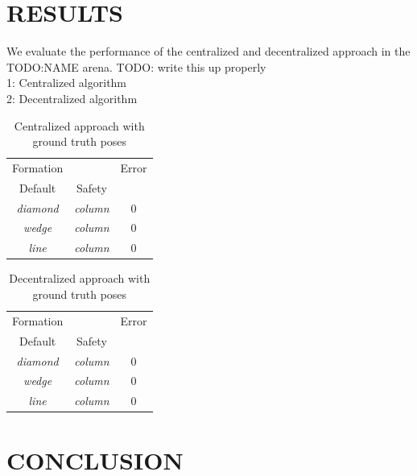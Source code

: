 \documentclass[letterpaper, 10 pt, conference]{ieeeconf}  %
\begin{document}
	\section{RESULTS}
	We evaluate the performance of the centralized and decentralized approach in the TODO:NAME arena. 
	TODO: write this up properly \\
	1: Centralized algorithm  \\
	2: Decentralized algorithm  \\
	
	\begin{table}[h]
		\begin{center}
			\begin{tabular}{|c c|c|}
				\hline
				Formation &         & Error \\
				Default   & Safety  &  \\
				\hline
				\textit{diamond} & \textit{column} & 0 \\
				\textit{wedge}   & \textit{column} & 0 \\
				\textit{line}    & \textit{column} & 0 \\
				\hline
			\end{tabular}
		\end{center}
		\caption{Centralized approach with ground truth poses}
		\label{table_results_centralized}
	\end{table}
	
	\begin{table}[h]
		\begin{center}
			\begin{tabular}{|c c|c|}
				\hline
				Formation &         & Error \\
				Default   & Safety  &  \\
				\hline
				\textit{diamond} & \textit{column} & 0 \\
				\textit{wedge}   & \textit{column} & 0 \\
				\textit{line}    & \textit{column} & 0 \\
				\hline
			\end{tabular}
		\end{center}
		\caption{Decentralized approach with ground truth poses}
		\label{table_results_decentralized}
	\end{table}
	
	
	\section{CONCLUSION}
	
\end{document}
